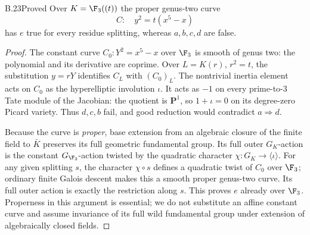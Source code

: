\begin{claim}{B.23}{Proved}
Over $K=\F_3((t))$ the proper genus-two curve
\[
 C:\quad y^2=t(x^5-x)
\]
has $e$ true for every residue splitting, whereas $a,b,c,d$ are false.
\end{claim}
\begin{proof}
The constant curve $C_0:Y^2=x^5-x$ over $\F_3$ is smooth of genus two:
the polynomial and its derivative are coprime. Over $L=K(r)$,
$r^2=t$, the substitution $y=rY$ identifies $C_L$ with $(C_0)_L$.
The nontrivial inertia element acts on $C_0$ as the hyperelliptic
involution $\iota$. It acts as $-1$ on every prime-to-$3$ Tate module
of the Jacobian: the quotient is $\mathbf P^1$, so
$1+\iota=0$ on its degree-zero Picard variety. Thus $d,c,b$ fail,
and good reduction would contradict $a\Rightarrow d$.

Because the curve is \emph{proper}, base extension from an algebraic
closure of the finite field to $\bar K$ preserves its full geometric
fundamental group. Its full outer $G_K$-action is the constant
$G_{\F_3}$-action twisted by the quadratic character
$\chi:G_K\to\langle\iota\rangle$. For any given splitting $s$,
the character $\chi\circ s$ defines a quadratic twist of $C_0$ over
$\F_3$; ordinary finite Galois descent makes this a smooth proper
genus-two curve. Its full outer action is exactly the restriction along
$s$. This proves $e$ already over $\F_3$. Properness in this argument
is essential; we do not substitute an affine constant curve and assume
invariance of its full wild fundamental group under extension of
algebraically closed fields.
\end{proof}

